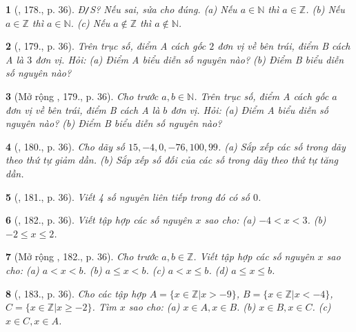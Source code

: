 \documentclass{article}
\newtheorem{baitoan}{}
\begin{document}
\begin{baitoan}[\cite{Tuyen_Toan_6}, 178., p. 36]
	{\rm Đ{\tt/}S?} Nếu sai, sửa cho đúng. (a) Nếu $a\in\mathbb{N}$ thì $a\in\mathbb{Z}$. (b) Nếu $a\in\mathbb{Z}$ thì $a\in\mathbb{N}$. (c) Nếu $a\notin\mathbb{Z}$ thì $a\notin\mathbb{N}$.
\end{baitoan}

\begin{baitoan}[\cite{Tuyen_Toan_6}, 179., p. 36]
	Trên trục số, điểm A cách gốc $2$ đơn vị về bên trái, điểm B cách A là $3$ đơn vị. Hỏi: (a) Điểm A biểu diễn số nguyên nào? (b) Điểm B biểu diễn số nguyên nào?
\end{baitoan}

\begin{baitoan}[Mở rộng \cite{Tuyen_Toan_6}, 179., p. 36]
	Cho trước $a,b\in\mathbb{N}$. Trên trục số, điểm A cách gốc $a$ đơn vị về bên trái, điểm B cách A là $b$ đơn vị. Hỏi: (a) Điểm A biểu diễn số nguyên nào? (b) Điểm B biểu diễn số nguyên nào?
\end{baitoan}

\begin{baitoan}[\cite{Tuyen_Toan_6}, 180., p. 36]
	Cho dãy số $15,-4,0,-76,100,99$. (a) Sắp xếp các số trong dãy theo thứ tự giảm dần. (b) Sắp xếp số đối của các số trong dãy theo thứ tự tăng dần.
\end{baitoan}

\begin{baitoan}[\cite{Tuyen_Toan_6}, 181., p. 36]
	Viết 4 số nguyên liên tiếp trong đó có số $0$.
\end{baitoan}

\begin{baitoan}[\cite{Tuyen_Toan_6}, 182., p. 36]
	Viết tập hợp các số nguyên $x$ sao cho: (a) $-4 < x < 3$. (b) $-2\le x\le 2$.
\end{baitoan}

\begin{baitoan}[Mở rộng \cite{Tuyen_Toan_6}, 182., p. 36]
	Cho trước $a,b\in\mathbb{Z}$. Viết tập hợp các số nguyên $x$ sao cho: (a) $a < x < b$. (b) $a\le x < b$. (c) $a < x\le b$. (d) $a\le x\le b$.
\end{baitoan}

\begin{baitoan}[\cite{Tuyen_Toan_6}, 183., p. 36]
	Cho các tập hợp $A = \{x\in\mathbb{Z}|x > -9\}$, $B = \{x\in\mathbb{Z}|x < -4\}$, $C = \{x\in\mathbb{Z}|x\ge-2\}$. Tìm $x$ sao cho: (a) $x\in A,x\in B$. (b) $x\in B,x\in C$. (c) $x\in C,x\in A$.
\end{baitoan}
\end{document}
